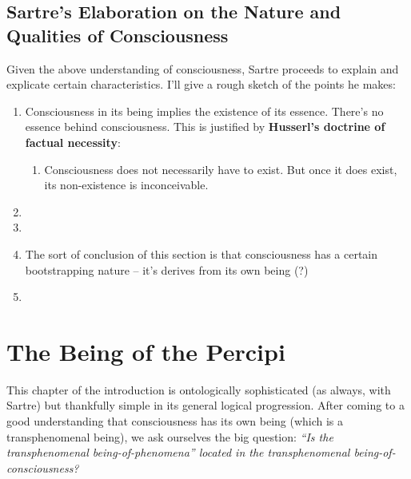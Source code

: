 \subsection{Sartre's Elaboration on the Nature and Qualities of Consciousness}
Given the above understanding of consciousness, Sartre proceeds to explain and explicate certain characteristics. I'll give a rough sketch of the points he makes:

\begin{enumerate}
  \item Consciousness in its being implies the existence of its essence. There's no essence behind consciousness. This is justified by \textbf{Husserl's doctrine of factual necessity}:
  \begin{enumerate}
    \item Consciousness does not necessarily have to exist. But once it does exist, its non-existence is inconceivable.
  \end{enumerate}
  \item {}
  \item {}
  \item The sort of conclusion of this section is that consciousness has a certain bootstrapping nature -- it's derives from its own being (?)
  \item {}
\end{enumerate}

\section{The Being of the Percipi}

This chapter of the introduction is ontologically sophisticated (as always, with Sartre) but thankfully simple in its general logical progression. After coming to a good understanding that consciousness has its own being (which is a transphenomenal being), we ask ourselves the big question: \emph{\enquote{Is the transphenomenal being-of-phenomena} located in the transphenomenal being-of-consciousness?} 

